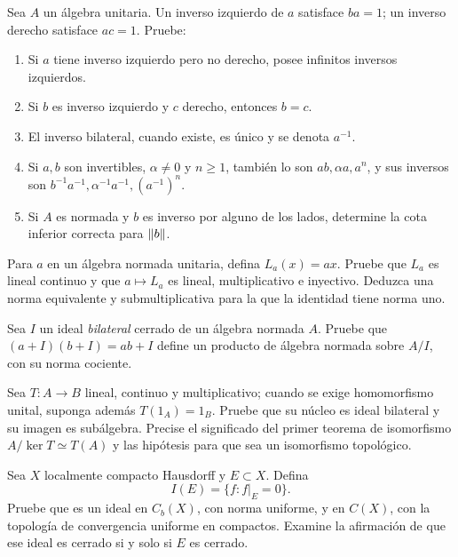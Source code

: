 \begin{ejercicio}\label{ej:v3-l19-2}
Sea $A$ un álgebra unitaria. Un inverso izquierdo de $a$ satisface $ba=1$; un inverso derecho satisface $ac=1$. Pruebe:
\begin{enumerate}
\item Si $a$ tiene inverso izquierdo pero no derecho, posee infinitos inversos izquierdos.
\item Si $b$ es inverso izquierdo y $c$ derecho, entonces $b=c$.
\item El inverso bilateral, cuando existe, es único y se denota $a^{-1}$.
\item Si $a,b$ son invertibles, $\alpha\ne0$ y $n\geq1$, también lo son $ab,\alpha a,a^n$, y sus inversos son $b^{-1}a^{-1},\alpha^{-1}a^{-1},(a^{-1})^n$.
\item Si $A$ es normada y $b$ es inverso por alguno de los lados, determine la cota inferior correcta para $\left\lVert b\right\rVert$.
\end{enumerate}
\end{ejercicio}


\begin{ejercicio}\label{ej:v3-l19-3}
Para $a$ en un álgebra normada unitaria, defina $L_a(x)=ax$. Pruebe que $L_a$ es lineal continuo y que $a\mapsto L_a$ es lineal, multiplicativo e inyectivo. Deduzca una norma equivalente y submultiplicativa para la que la identidad tiene norma uno.
\end{ejercicio}


\begin{ejercicio}\label{ej:v3-l19-4}
Sea $I$ un ideal \emph{bilateral} cerrado de un álgebra normada $A$. Pruebe que $(a+I)(b+I)=ab+I$ define un producto de álgebra normada sobre $A/I$, con su norma cociente.
\end{ejercicio}


\begin{ejercicio}\label{ej:v3-l19-5}
Sea $T:A\to B$ lineal, continuo y multiplicativo; cuando se exige homomorfismo unital, suponga además $T(1_A)=1_B$. Pruebe que su núcleo es ideal bilateral y su imagen es subálgebra. Precise el significado del primer teorema de isomorfismo $A/\ker T\simeq T(A)$ y las hipótesis para que sea un isomorfismo topológico.
\end{ejercicio}


\begin{ejercicio}\label{ej:v3-l19-6}
Sea $X$ localmente compacto Hausdorff y $E\subset X$. Defina
\[
 I(E)=\{f:f|_E=0\}.
\]
Pruebe que es un ideal en $C_b(X)$, con norma uniforme, y en $C(X)$, con la topología de convergencia uniforme en compactos. Examine la afirmación de que ese ideal es cerrado si y solo si $E$ es cerrado.
\end{ejercicio}


